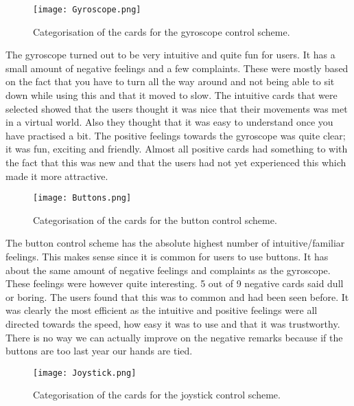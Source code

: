\begin{figure}[H]
\centering
\texttt{[image: Gyroscope.png]}
\caption{Categorisation of the cards for the gyroscope control scheme.}
\end{figure}

The gyroscope turned out to be very intuitive and quite fun for users. It has a small amount of negative feelings and a few complaints. These were mostly based on the fact that you have to turn all the way around and not being able to sit down while using this and that it moved to slow. 
The intuitive cards that were selected showed that the users thought it was nice that their movements was met in a virtual world. Also they thought that it was easy to understand once you have practised a bit. 
The positive feelings towards the gyroscope was quite clear; it was fun, exciting and friendly. Almost all positive cards had something to with the fact that this was new and that the users had not yet experienced this which made it more attractive.

\begin{figure}[H]
\centering
\texttt{[image: Buttons.png]}
\caption{Categorisation of the cards for the button control scheme.}
\end{figure}

The button control scheme has the absolute highest number of intuitive/familiar feelings. This makes sense since it is common for users to use buttons. 
It has about the same amount of negative feelings and complaints as the gyroscope. These feelings were however quite interesting. 5 out of 9 negative cards said dull or boring. The users found that this was to common and had been seen before. It was clearly the most efficient as the intuitive and positive feelings were all directed towards the speed, how easy it was to use and that it was trustworthy. 
There is no way we can actually improve on the negative remarks because if the buttons are too last year our hands are tied.

\begin{figure}[H]
\centering
\texttt{[image: Joystick.png]}
\caption{Categorisation of the cards for the joystick control scheme.}
\end{figure}

